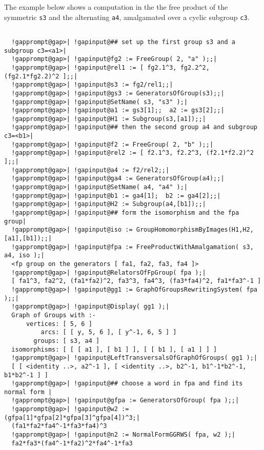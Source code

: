 \documentclass[a4paper,11pt]{report}
\begin{document}
{{{ The example below shows a computation in the the free product of the symmetric \texttt{s3} and the alternating \texttt{a4}, amalgamated over a cyclic subgroup \texttt{c3}. 

 }

 
\begin{Verbatim}[commandchars=!@|,fontsize=\small,frame=single,label=Example]
  
  !gapprompt@gap>| !gapinput@## set up the first group s3 and a subgroup c3=<a1>|
  !gapprompt@gap>| !gapinput@fg2 := FreeGroup( 2, "a" );;|
  !gapprompt@gap>| !gapinput@rel1 := [ fg2.1^3, fg2.2^2, (fg2.1*fg2.2)^2 ];;|
  !gapprompt@gap>| !gapinput@s3 := fg2/rel1;;|
  !gapprompt@gap>| !gapinput@gs3 := GeneratorsOfGroup(s3);;|
  !gapprompt@gap>| !gapinput@SetName( s3, "s3" );|
  !gapprompt@gap>| !gapinput@a1 := gs3[1];;  a2 := gs3[2];;|
  !gapprompt@gap>| !gapinput@H1 := Subgroup(s3,[a1]);;|
  !gapprompt@gap>| !gapinput@## then the second group a4 and subgroup c3=<b1>|
  !gapprompt@gap>| !gapinput@f2 := FreeGroup( 2, "b" );;|
  !gapprompt@gap>| !gapinput@rel2 := [ f2.1^3, f2.2^3, (f2.1*f2.2)^2 ];;|
  !gapprompt@gap>| !gapinput@a4 := f2/rel2;;|
  !gapprompt@gap>| !gapinput@ga4 := GeneratorsOfGroup(a4);;|
  !gapprompt@gap>| !gapinput@SetName( a4, "a4" );|
  !gapprompt@gap>| !gapinput@b1 := ga4[1];  b2 := ga4[2];;|
  !gapprompt@gap>| !gapinput@H2 := Subgroup(a4,[b1]);;|
  !gapprompt@gap>| !gapinput@## form the isomorphism and the fpa group|
  !gapprompt@gap>| !gapinput@iso := GroupHomomorphismByImages(H1,H2,[a1],[b1]);;|
  !gapprompt@gap>| !gapinput@fpa := FreeProductWithAmalgamation( s3, a4, iso );|
  <fp group on the generators [ fa1, fa2, fa3, fa4 ]>
  !gapprompt@gap>| !gapinput@RelatorsOfFpGroup( fpa );|
  [ fa1^3, fa2^2, (fa1*fa2)^2, fa3^3, fa4^3, (fa3*fa4)^2, fa1*fa3^-1 ]
  !gapprompt@gap>| !gapinput@gg1 := GraphOfGroupsRewritingSystem( fpa );;|
  !gapprompt@gap>| !gapinput@Display( gg1 );|
  Graph of Groups with :-
      vertices: [ 5, 6 ]
          arcs: [ [ y, 5, 6 ], [ y^-1, 6, 5 ] ]
        groups: [ s3, a4 ]
  isomorphisms: [ [ [ a1 ], [ b1 ] ], [ [ b1 ], [ a1 ] ] ]
  !gapprompt@gap>| !gapinput@LeftTransversalsOfGraphOfGroups( gg1 );|
  [ [ <identity ..>, a2^-1 ], [ <identity ..>, b2^-1, b1^-1*b2^-1, b1*b2^-1 ] ]
  !gapprompt@gap>| !gapinput@## choose a word in fpa and find its normal form |
  !gapprompt@gap>| !gapinput@gfpa := GeneratorsOfGroup( fpa );;|
  !gapprompt@gap>| !gapinput@w2 := (gfpa[1]*gfpa[2]*gfpa[3]^gfpa[4])^3;|
  (fa1*fa2*fa4^-1*fa3*fa4)^3
  !gapprompt@gap>| !gapinput@n2 := NormalFormGGRWS( fpa, w2 );|
  fa2*fa3*(fa4^-1*fa2)^2*fa4^-1*fa3
  

\end{Verbatim}}}
\end{document}
